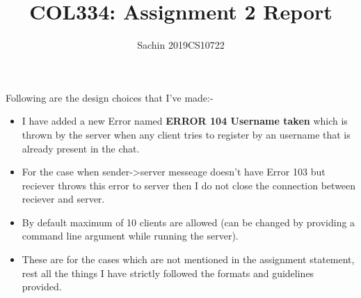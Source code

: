 \documentclass{article}
\title{COL334: Assignment 2 Report}
\author{Sachin 2019CS10722}
\begin{document}
\maketitle

Following are the design choices that I've made:-

\begin{itemize}
    \item I have added a new Error named \textbf{ERROR 104 Username taken} which 
    is thrown by the server when any client tries to register by an username that is 
    already present in the chat.

    \item For the case when sender->server messeage doesn't have Error 103 but reciever throws 
    this error to server then I do not close the connection between reciever and server.

    \item By default maximum of 10 clients are allowed (can be changed by providing a command line 
    argument while running the server).

    \item These are for the cases which are not mentioned in the assignment statement, rest all the things 
    I have strictly followed the formats and guidelines provided.
\end{itemize}
\end{document}
